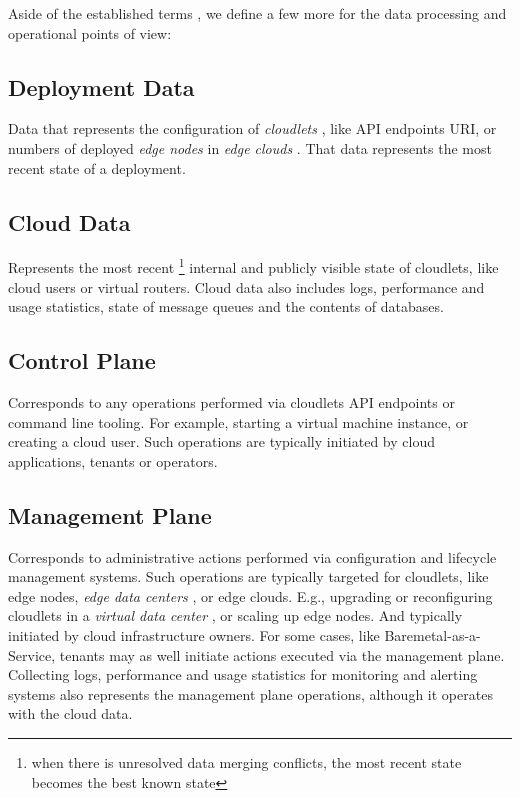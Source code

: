 \documentclass[conference]{IEEEtran}
\begin{document}
Aside of the established terms \cite{b3}, we define a few more for the data
processing and operational points of view:

\subsection{Deployment Data}

Data that represents the configuration of \textit{cloudlets} \cite{b3}, like
API endpoints URI, or numbers of deployed \textit{edge nodes} \cite{b3} in
\textit{edge clouds} \cite{b3}. That data represents the most recent state of a
deployment.

\subsection{Cloud Data}

Represents the most recent \footnote{when there is unresolved data merging
conflicts, the most recent state becomes the best known state} internal and
publicly visible state of cloudlets, like cloud users or virtual routers. Cloud
data also includes logs, performance and usage statistics, state of message
queues and the contents of databases.

\subsection{Control Plane}

Corresponds to any operations performed via cloudlets API endpoints or command
line tooling. For example, starting a virtual machine instance, or creating a
cloud user. Such operations are typically initiated by cloud applications,
tenants or operators.

\subsection{Management Plane}

Corresponds to administrative actions performed via configuration and lifecycle
management systems. Such operations are typically targeted for cloudlets, like
edge nodes, \textit{edge data centers} \cite{b3}, or edge clouds. E.g.,
upgrading or reconfiguring cloudlets in a \textit{virtual data center}
\cite{b3}, or scaling up edge nodes. And typically initiated by cloud
infrastructure owners.  For some cases, like Baremetal-as-a-Service, tenants
may as well initiate actions executed via the management plane. Collecting
logs, performance and usage statistics for monitoring and alerting systems also
represents the management plane operations, although it operates with the cloud
data.
\end{document}
